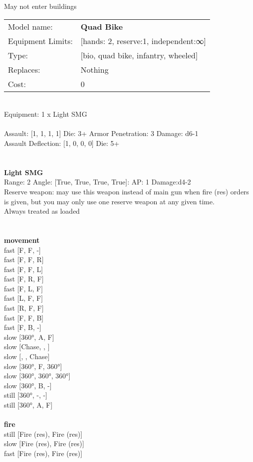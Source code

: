 \noindent May not enter buildings\\ 


\noindent
\begin{tabular}{ll}
Model name: &{\bf Quad Bike } \\
Equipment Limits: &[hands: 2, reserve:1, independent:∞] \\
Type: &[bio, quad bike, infantry, wheeled] \\
Replaces: &Nothing \\
Cost: & 0\\
\end{tabular}
\ \\
Equipment: 1 x Light SMG \\
\ \\
Assault: [1, 1, 1, 1] Die: 3+ Armor Penetration: 3 Damage: d6-1 \\
Assault Deflection: [1, 0, 0, 0] Die: 5+\\
\indent  
\ \\

\ \\
{\bf Light SMG } \\



Range: 2  Angle: [True, True, True, True]: AP: 1 Damage:d4-2 \\
Reserve weapon: may use this weapon instead of main gun when fire (res) orders is given, but you may only use one reserve weapon at any given time.\\ 
Always treated as loaded\\ 




 
\ \\



\ \\ {\bf movement } \\
fast [F, F, -] \\
fast [F, F, R] \\
fast [F, F, L] \\
fast [F, R, F] \\
fast [F, L, F] \\
fast [L, F, F] \\
fast [R, F, F] \\
fast [F, F, B] \\
fast [F, B, -] \\
slow [360°, A, F] \\
slow [Chase, , ] \\
slow [, , Chase] \\
slow [360°, F, 360°] \\
slow [360°, 360°, 360°] \\
slow [360°, B, -] \\
still [360°, -, -] \\
still [360°, A, F] \\
\ \\ {\bf fire } \\
still [Fire (res), Fire (res)] \\
slow [Fire (res), Fire (res)] \\
fast [Fire (res), Fire (res)] \\


